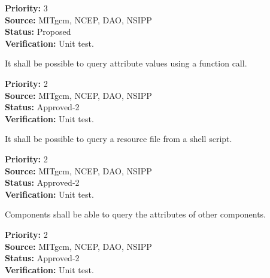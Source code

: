 \begin{reqlist}
{\bf Priority:} 3 \\
{\bf Source:} MITgcm, NCEP, DAO, NSIPP \\
{\bf Status:} Proposed \\ 
{\bf Verification:} Unit test.\\
\end{reqlist}



It shall be possible to query attribute values using a function call.

\begin{reqlist}
{\bf Priority:} 2 \\
{\bf Source:} MITgcm, NCEP, DAO, NSIPP \\
{\bf Status:} Approved-2 \\ 
{\bf Verification:} Unit test.\\
\end{reqlist}


It shall be possible to query a resource file from a shell script. 

\begin{reqlist}
{\bf Priority:} 2 \\
{\bf Source:} MITgcm, NCEP, DAO, NSIPP \\
{\bf Status:} Approved-2 \\ 
{\bf Verification:} Unit test.\\
\end{reqlist}


Components shall be able to query the attributes of other components.

\begin{reqlist}
{\bf Priority:} 2 \\
{\bf Source:} MITgcm, NCEP, DAO, NSIPP \\
{\bf Status:} Approved-2 \\ 
{\bf Verification:} Unit test.\\
\end{reqlist}




